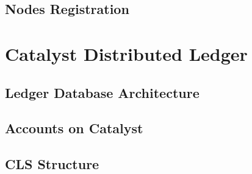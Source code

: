 \documentclass[a4paper, 12pt]{book}
\begin{document}
\section{Nodes Registration}\label{Sec:Reg}




%



\chapter{Catalyst Distributed Ledger} \label{Cha:LDA}


\section{Ledger Database Architecture} \label{Sec:LDA}



\section{Accounts on Catalyst} \label{Sec:AoC}



\section{CLS Structure}\label{SecLCS}


	

%
\end{document}
